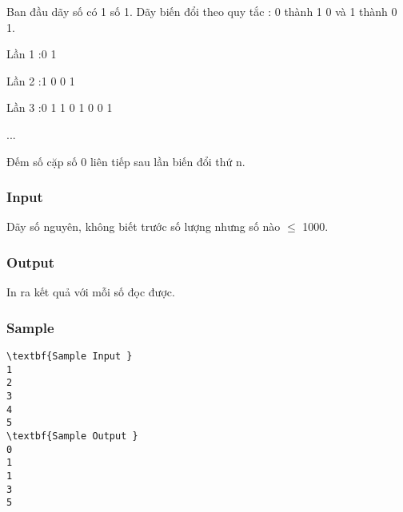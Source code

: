

Ban đầu dãy số có 1 số 1. Dãy biến đổi theo quy tắc : 0 thành 1 0 và 1 thành 0 1.

Lần 1 :0 1

Lần 2 :1 0 0 1

Lần 3 :0 1 1 0 1 0 0 1

...

Đếm số cặp số 0 liên tiếp sau lần biến đổi thứ n.

\subsubsection{Input}

Dãy số nguyên, không biết trước số lượng nhưng số nào  $\le$ 1000.

\subsubsection{Output}

In ra kết quả với mỗi số đọc được.

\subsubsection{Sample}
\begin{verbatim}
\textbf{Sample Input }
1
2 
3 
4
5 
\textbf{Sample Output }
0
1 
1
3
5
\end{verbatim}
